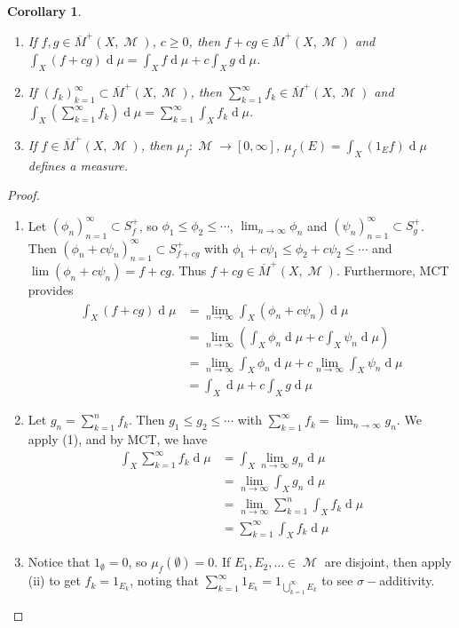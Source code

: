 \documentclass[12pt, a4paper]{memoir}
\newtheorem{corollary}[theorem]{Corollary}
\theoremstyle{nonumberplain}
\newtheorem{proof}{Proof}
\DeclareMathOperator{\M}{\mathcal{M}}
\renewcommand{\d}[1]{\ensuremath{\operatorname{d}\!{#1}}} %
\begin{document}
\begin{corollary}
    \begin{enumerate}
        \item If $f,g\in\overline{M}^+(X,\M)$, $c\geq 0$, then $f+cg\in\overline{M}^+(X,\M)$ and $\int_X(f+cg)\d{\mu}=\int_X f\d{\mu}+c\int_Xg\d{\mu}$.
        \item If $(f_k)_{k=1}^\infty\subset\overline{M}^+(X,\M)$, then $\sum_{k=1}^\infty f_k\in\overline{M}^+(X,\M)$ and $\int_X\left(\sum_{k=1}^\infty f_k\right)\d{\mu}=\sum_{k=1}^\infty\int_X f_k\d{\mu}$.
        \item If $f\in\overline{M}^+(X,\M)$, then $\mu_f:\M\to[0,\infty]$, $\mu_f(E)=\int_X(1_Ef)\d{\mu}$ defines a measure.
    \end{enumerate}
\end{corollary}
\begin{proof}
    \begin{enumerate}
        \item Let $(\phi_n)_{n=1}^\infty\subset S_f^+$, so $\phi_1\leq\phi_2\leq\cdots$, $\lim_{n\to\infty}\phi_n$ and $(\psi_n)_{n=1}^\infty\subset S_g^+$.
            Then $(\phi_n+c\psi_n)_{n=1}^\infty\subset S^+_{f+cg}$ with $\phi_1+c\psi_1\leq\phi_2+c\psi_2\leq\cdots$ and $\lim(\phi_n+c\psi_n)=f+cg$.
            Thus $f+cg\in\overline{M}^+(X,\M)$.
            Furthermore, MCT provides
            \begin{align*}
                \int_X (f+cg)\d{\mu} &= \lim_{n\to\infty}\int_X(\phi_n+c\psi_n)\d{\mu}\\
                                     &= \lim_{n\to\infty}\left(\int_X\phi_n\d{\mu}+c\int_X\psi_n\d{\mu}\right)\\
                                     &= \lim_{n\to\infty}\int_X\phi_n\d{\mu}+c\lim_{n\to\infty}\int_X\psi_n\d{\mu}\\
                                     &= \int_X\d{\mu}+c\int_Xg\d{\mu}
            \end{align*}
        \item Let $g_n=\sum_{k=1}^n f_k$.
            Then $g_1\leq g_2\leq\cdots$ with $\sum_{k=1}^\infty f_k=\lim_{n\to\infty}g_n$.
            We apply (1), and by MCT, we have
            \begin{align*}
                \int_X\sum\limits_{k=1}^\infty f_k\d{\mu} &=\int_X\lim_{n\to\infty} g_n\d{\mu}\\
                                                          &=\lim_{n\to\infty}\int_X g_n\d{\mu}\\
                                                          &=\lim_{n\to\infty}\sum\limits_{k=1}^n\int_Xf_k\d{\mu}\\
                                                          &=\sum\limits_{k=1}^\infty\int_X f_k\d{\mu}
            \end{align*}
        \item Notice that $1_\emptyset=0$, so $\mu_f(\emptyset)=0$.
            If $E_1,E_2,\ldots\in\M$ are disjoint, then apply (ii) to get $f_k=1_{E_k}$, noting that $\sum_{k=1}^\infty 1_{E_k}=1_{\bigcup_{k=1}^\infty E_k}$ to see $\sigma-$additivity.
    \end{enumerate}
\end{proof}
\end{document}

